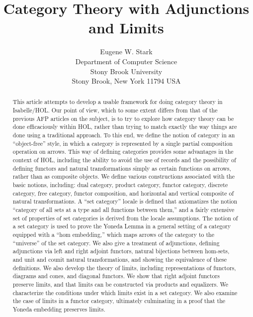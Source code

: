 \documentclass[11pt,notitlepage,a4paper]{report}
\begin{document}
\title{Category Theory with Adjunctions and Limits}
\author{Eugene W. Stark\\[\medskipamount]
        Department of Computer Science\\
        Stony Brook University\\
        Stony Brook, New York 11794 USA}
\maketitle

\begin{abstract}
This article attempts to develop a usable framework for doing category theory in Isabelle/HOL.
Our point of view, which to some extent differs from that of the previous AFP articles
on the subject, is to try to explore how category theory can be done efficaciously within
HOL, rather than trying to match exactly the way things are done using a traditional
approach.  To this end, we define the notion of category in an ``object-free''
style, in which a category is represented by a single partial composition operation on arrows.
This way of defining categories provides some advantages in the context of HOL, including
the ability to avoid the use of records and the possibility of defining functors and
natural transformations simply as certain functions on arrows, rather than as composite
objects.  We define various constructions associated with the basic notions,
including: dual category, product category, functor category, discrete category, free category,
functor composition, and horizontal and vertical composite of natural transformations.
A ``set category'' locale is defined that axiomatizes the notion ``category of all sets at
a type and all functions between them,'' and a fairly extensive set of properties of set
categories is derived from the locale assumptions.
The notion of a set category is used to prove the Yoneda Lemma in a general setting
of a category equipped with a ``hom embedding,'' which maps arrows of the category
to the ``universe'' of the set category.
We also give a treatment of adjunctions, defining adjunctions via left and right adjoint
functors, natural bijections between hom-sets, and unit and counit natural transformations,
and showing the equivalence of these definitions.
We also develop the theory of limits, including representations of functors,
diagrams and cones, and diagonal functors.  We show that right adjoint functors preserve
limits, and that limits can be constructed via products and equalizers.  We characterize
the conditions under which limits exist in a set category.  We also examine the case of
limits in a functor category, ultimately culminating in a proof that the Yoneda embedding
preserves limits.
\end{abstract}
\end{document}
